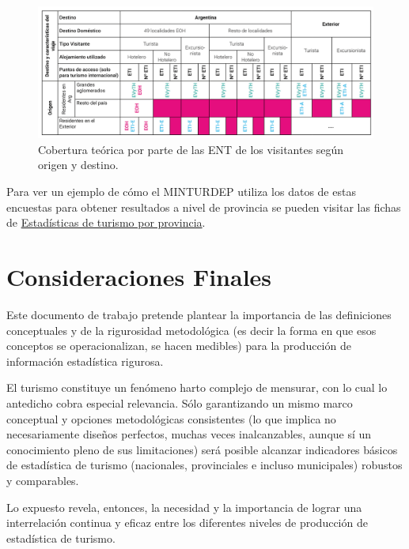 \documentclass[
  openany]{book}
\begin{document}
\begin{figure}

{\centering \includegraphics[width=1\linewidth]{imagenes/figura2.4} 

}

\caption{Cobertura teórica por parte de las ENT de los visitantes según origen y destino.}\label{fig:coberturaENT}
\end{figure}

Para ver un ejemplo de cómo el MINTURDEP utiliza los datos de estas encuestas para obtener resultados a nivel de provincia se pueden visitar las fichas de \href{https://www.yvera.tur.ar/estadistica/informe/info/estadisticas-de-turismo-por-provincias}{Estadísticas de turismo por provincia}.

\hypertarget{consideraciones-finales}{%
\chapter*{Consideraciones Finales}\label{consideraciones-finales}}

Este documento de trabajo pretende plantear la importancia de las definiciones conceptuales y de la rigurosidad metodológica (es decir la forma en que esos conceptos se operacionalizan, se hacen medibles) para la producción de información estadística rigurosa.

El turismo constituye un fenómeno harto complejo de mensurar, con lo cual lo antedicho cobra especial relevancia.
Sólo garantizando un mismo marco conceptual y opciones metodológicas consistentes (lo que implica no necesariamente diseños perfectos, muchas veces inalcanzables, aunque sí un conocimiento pleno de sus limitaciones) será posible alcanzar indicadores básicos de estadística de turismo (nacionales, provinciales e incluso municipales) robustos y comparables.

Lo expuesto revela, entonces, la necesidad y la importancia de lograr una interrelación continua y eficaz entre los diferentes niveles de producción de estadística de turismo.

  
\end{document}
